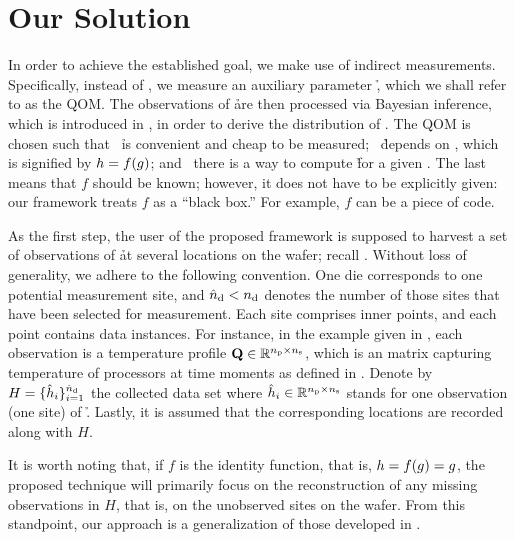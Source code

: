 \section{Our Solution}

In order to achieve the established goal, we make use of indirect measurements.
Specifically, instead of \g, we measure an auxiliary parameter \h, which we
shall refer to as the \ac{QOM}. The observations of \h are then processed via
Bayesian inference, which is introduced in , in order
to derive the distribution of \g. The \ac{QOM} is chosen such that \one~\h is
convenient and cheap to be measured; \two~\h depends on \g, which is signified
by $h = f(g)$; and \three~there is a way to compute \h for a given \g. The
last means that $f$ should be known; however, it does not have to be explicitly
given: our framework treats $f$ as a ``black box.'' For example, $f$ can be a
piece of code.

As the first step, the user of the proposed framework is supposed to harvest a
set of observations of \h at several locations on the wafer; recall
. Without loss of generality, we adhere to the following
convention. One die corresponds to one potential measurement site, and ${\hat{n}_\mathrm{d}} <
{n_\mathrm{d}}$ denotes the number of those sites that have been selected for measurement.
Each site comprises \np inner points, and each point contains \ns data
instances. For instance, in the example given in , each
observation is a temperature profile $\mathbf{Q} \in \mathbb{R}^{{n_\mathrm{p}} \times {n_\mathrm{s}}}$, which is
an matrix capturing temperature of \np processors at \ns time moments as defined
in . Denote by $H = \{ \hat{h}_i \}_{i = 1}^{{\hat{n}_\mathrm{d}}}$ the
collected data set where $\hat{h}_i \in \mathbb{R}^{{n_\mathrm{p}} \times {n_\mathrm{s}}}$ stands for one
observation (one site) of \h. Lastly, it is assumed that the corresponding
locations are recorded along with $H$.

It is worth noting that, if $f$ is the identity function, that is, $h = f(g) =
g$, the proposed technique will primarily focus on the reconstruction of any
missing observations in $H$, that is, on the unobserved sites on the wafer. From
this standpoint, our approach is a generalization of those developed in
\cite{zhang2010, reda2009}.

